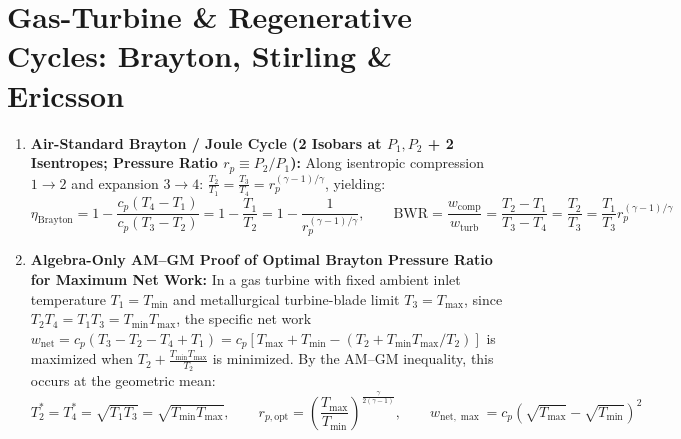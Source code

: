 \section{Gas-Turbine \& Regenerative Cycles: Brayton, Stirling \& Ericsson}\label{sec:09.5}

\begin{formulacard}
\begin{enumerate}
  \item \textbf{Air-Standard Brayton / Joule Cycle (2 Isobars at $P_1, P_2$ + 2 Isentropes; Pressure Ratio $r_p \equiv P_2/P_1$):}
  Along isentropic compression $1\to 2$ and expansion $3\to 4$: $\frac{T_2}{T_1} = \frac{T_3}{T_4} = r_p^{(\gamma-1)/\gamma}$, yielding:
  \begin{equation}\label{eq:09:brayton}
    \boxed{\eta_{\mathrm{Brayton}} = 1 - \frac{c_p(T_4 - T_1)}{c_p(T_3 - T_2)} = 1 - \frac{T_1}{T_2} = 1 - \frac{1}{r_p^{(\gamma - 1)/\gamma}}}, \qquad \mathrm{BWR} = \frac{w_{\mathrm{comp}}}{w_{\mathrm{turb}}} = \frac{T_2 - T_1}{T_3 - T_4} = \frac{T_2}{T_3} = \frac{T_1}{T_3}r_p^{(\gamma-1)/\gamma}
  \end{equation}
  \item \textbf{Algebra-Only AM--GM Proof of Optimal Brayton Pressure Ratio for Maximum Net Work:}
  In a gas turbine with fixed ambient inlet temperature $T_1 = T_{\min}$ and metallurgical turbine-blade limit $T_3 = T_{\max}$, since $T_2 T_4 = T_1 T_3 = T_{\min}T_{\max}$, the specific net work $w_{\mathrm{net}} = c_p(T_3 - T_2 - T_4 + T_1) = c_p\left[T_{\max} + T_{\min} - (T_2 + T_{\min}T_{\max}/T_2)\right]$ is maximized when $T_2 + \frac{T_{\min}T_{\max}}{T_2}$ is minimized. By the AM--GM inequality, this occurs at the geometric mean:
  \begin{equation}\label{eq:09:brayton-opt}
    \boxed{T_2^* = T_4^* = \sqrt{T_1 T_3} = \sqrt{T_{\min}T_{\max}}}, \qquad \boxed{r_{p,\mathrm{opt}} = \left(\frac{T_{\max}}{T_{\min}}\right)^{\frac{\gamma}{2(\gamma - 1)}}}, \qquad \boxed{w_{\mathrm{net,\max}} = c_p\left(\sqrt{T_{\max}} - \sqrt{T_{\min}}\right)^2}

\end{equation}
\end{enumerate}
\end{formulacard}
